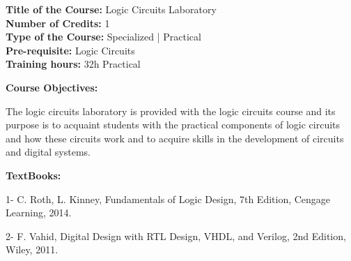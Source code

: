\documentclass[12pt,a4paper]{article}
\begin{document}
\newpage
\textbf{Title of the Course:} Logic Circuits Laboratory\\
\textbf{Number of Credits:} 1\\
\textbf{Type of the Course:} Specialized | Practical\\
\textbf{Pre-requisite:} Logic Circuits\\
\textbf{Training hours:} 32h Practical\par\vspace{4pt}
\textbf{Course Objectives:}\par\vspace{2pt}
The logic circuits laboratory is provided with the logic circuits course and its purpose is to acquaint
students with the practical components of logic circuits and how these circuits work and to acquire
skills in the development of circuits and digital systems.\par\vspace{4pt}
\textbf{TextBooks:}\par\vspace{2pt}
1- C. Roth, L. Kinney, Fundamentals of Logic Design, 7th Edition, Cengage Learning, 2014.\par
2- F. Vahid, Digital Design with RTL Design, VHDL, and Verilog, 2nd Edition, Wiley, 2011.\par
\vspace{4pt}
\end{document}
